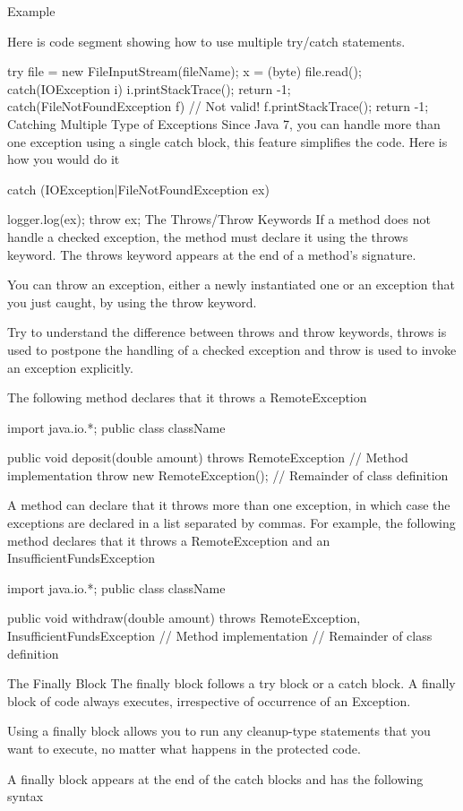 Example

Here is code segment showing how to use multiple try/catch statements.

try {
   file = new FileInputStream(fileName);
   x = (byte) file.read();
}catch(IOException i) {
   i.printStackTrace();
   return -1;
}catch(FileNotFoundException f) // Not valid! {
   f.printStackTrace();
   return -1;
}
Catching Multiple Type of Exceptions
Since Java 7, you can handle more than one exception using a single catch block, this feature simplifies the code. Here is how you would do it

catch (IOException|FileNotFoundException ex) {
   logger.log(ex);
   throw ex;
The Throws/Throw Keywords
If a method does not handle a checked exception, the method must declare it using the throws keyword. The throws keyword appears at the end of a method's signature.

You can throw an exception, either a newly instantiated one or an exception that you just caught, by using the throw keyword.

Try to understand the difference between throws and throw keywords, throws is used to postpone the handling of a checked exception and throw is used to invoke an exception explicitly.

The following method declares that it throws a RemoteException

import java.io.*;
public class className {

   public void deposit(double amount) throws RemoteException {
      // Method implementation
      throw new RemoteException();
   }
   // Remainder of class definition
}
A method can declare that it throws more than one exception, in which case the exceptions are declared in a list separated by commas. For example, the following method declares that it throws a RemoteException and an InsufficientFundsException

import java.io.*;
public class className {

   public void withdraw(double amount) throws RemoteException,
      InsufficientFundsException {
      // Method implementation
   }
   // Remainder of class definition
}
The Finally Block
The finally block follows a try block or a catch block. A finally block of code always executes, irrespective of occurrence of an Exception.

Using a finally block allows you to run any cleanup-type statements that you want to execute, no matter what happens in the protected code.

A finally block appears at the end of the catch blocks and has the following syntax

}
